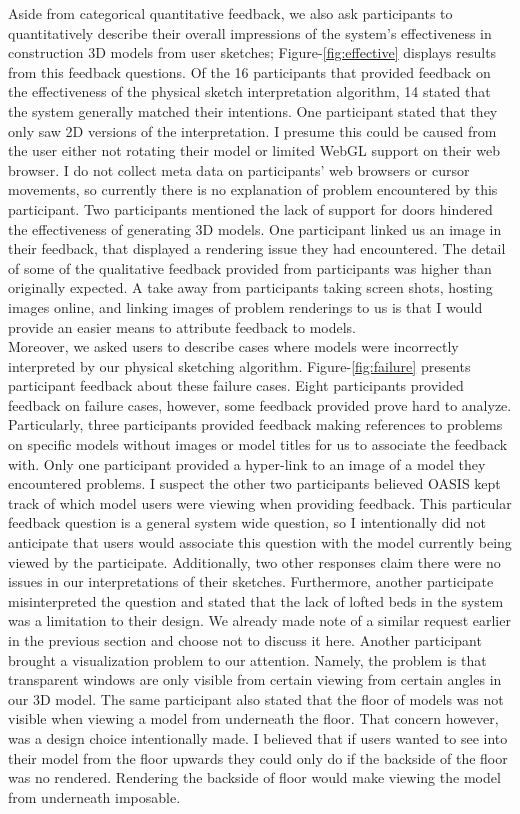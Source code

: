 Aside from categorical quantitative feedback, we also ask participants to quantitatively describe their overall impressions of the system's effectiveness in construction 3D models from user sketches; 
Figure-\ref{fig:effective} displays results from this feedback questions.
Of the 16 participants that provided feedback on the effectiveness of the physical sketch interpretation algorithm, 14 stated that the system generally matched their intentions.
One participant stated that they only saw 2D versions of the interpretation.
I presume this could be caused from the user either not rotating their model or limited WebGL support on their web browser.
I do  not collect meta data on participants' web browsers or cursor movements, so currently there is no explanation of problem encountered by this participant.
Two participants mentioned the lack of support for doors hindered the effectiveness of generating 3D models.
One participant linked us an image in their feedback, that displayed a rendering issue they had encountered.
The detail of some of the qualitative feedback provided from participants was higher than originally expected.
A take away from participants taking screen shots, hosting images online, and linking images of problem renderings to us is that I would provide an easier means to attribute feedback to models.\\
\clearpage
Moreover, we asked users to describe cases where models were incorrectly interpreted by our physical sketching algorithm.
Figure-\ref{fig:failure} presents participant feedback about these failure cases.
Eight participants provided feedback on failure cases, however, some feedback provided prove hard to analyze.
Particularly, three participants provided feedback making references to problems on specific models without images or model titles for us to associate the feedback with.
Only one participant provided a hyper-link to an image of a model they encountered problems.
I suspect the other two participants believed OASIS kept track of which model users were viewing when providing feedback.
This particular feedback question is a general system wide question, so I intentionally did not anticipate that users would associate this question with the model currently being viewed by the participate.
Additionally, two other responses claim there were no issues in our interpretations of their sketches.
Furthermore, another participate misinterpreted the question and stated that the lack of lofted beds in the system was a limitation to their design.
We already made note of a similar request earlier in the previous section and choose not to discuss it here.
Another participant brought a visualization problem to our attention. 
Namely, the problem is that transparent windows are only visible from certain viewing from certain angles in our 3D model.
The same participant also stated that the floor of models was not visible when viewing a model from underneath the floor.
That concern however, was a design choice intentionally made.
I believed that if users wanted to see into their model from the floor upwards they could only do if the backside of the floor was no rendered.
Rendering the backside of floor would make viewing the model from underneath imposable.

